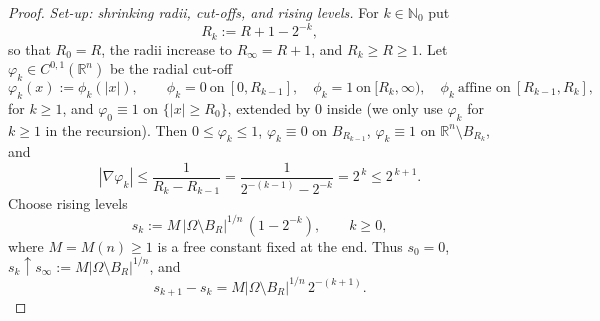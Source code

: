 \documentclass[11pt]{amsart}
\theoremstyle{definition}
\newcommand{\R}{\mathbb R}
\newcommand{\Om}{\Omega}
\newcommand{\abs}[1]{\left|#1\right|}
\begin{document}
\begin{proof}
\smallskip
\emph{Set-up: shrinking radii, cut-offs, and rising levels.}
For $k\in\mathbb N_0$ put
\[
   R_k:=R+1-2^{-k},
\]
so that $R_0=R$, the radii increase to $R_\infty=R+1$, and
$R_k\ge R\ge1$.
Let $\varphi_k\in C^{0,1}(\R^n)$ be the radial cut-off
\[
   \varphi_k(x):=\phi_k(\abs{x}),\qquad
   \phi_k=0\ \text{on}\ [0,R_{k-1}],\quad
   \phi_k=1\ \text{on}\ [R_k,\infty),\quad
   \phi_k\ \text{affine on}\ [R_{k-1},R_k],
\]
for $k\ge1$, and $\varphi_0\equiv1$ on $\{\abs{x}\ge R_0\}$, extended by
$0$ inside (we only use $\varphi_k$ for $k\ge1$ in the recursion). Then
$0\le\varphi_k\le1$, $\varphi_k\equiv0$ on $B_{R_{k-1}}$, $\varphi_k\equiv1$
on $\R^n\setminus B_{R_k}$, and
\[
   \abs{\nabla\varphi_k}\le\frac1{R_k-R_{k-1}}
   =\frac1{2^{-(k-1)}-2^{-k}}=2^{\,k}\le 2^{\,k+1}.
\]
Choose rising levels
\[
   s_k:=M\,\abs{\Om\setminus B_R}^{1/n}\,(1-2^{-k}),\qquad k\ge0,
\]
where $M=M(n)\ge1$ is a free constant fixed at the end. Thus $s_0=0$,
$s_k\uparrow s_\infty:=M\abs{\Om\setminus B_R}^{1/n}$, and
\begin{equation}\label{eq:s-diff}
   s_{k+1}-s_k=M\abs{\Om\setminus B_R}^{1/n}\,2^{-(k+1)} .
\end{equation}


\end{proof}
\end{document}
